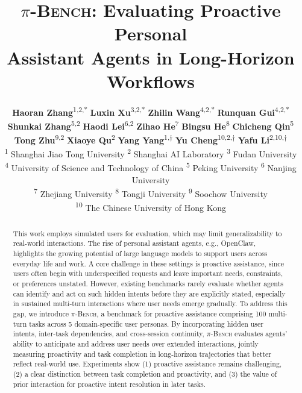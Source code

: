 \documentclass{article}
\title{\textsc{$\pi$-Bench}: Evaluating Proactive Personal \\ Assistant Agents in Long-Horizon Workflows}
\author{
\begin{minipage}{\textwidth}
\centering
\normalfont
\textbf{Haoran Zhang}\textsuperscript{1,2,*}\hspace{1em}
\textbf{Luxin Xu}\textsuperscript{3,2,*}\hspace{1em}
\textbf{Zhilin Wang}\textsuperscript{4,2,*}\hspace{1em}
\textbf{Runquan Gui}\textsuperscript{4,2,*}\\
\textbf{Shunkai Zhang}\textsuperscript{5,2}\hspace{1em}
\textbf{Haodi Lei}\textsuperscript{6,2}\hspace{1em}
\textbf{Zihao He}\textsuperscript{7}\hspace{1em}
\textbf{Bingsu He}\textsuperscript{8}\hspace{1em}
\textbf{Chicheng Qin}\textsuperscript{5}\\
\textbf{Tong Zhu}\textsuperscript{9,2}\hspace{1em}
\textbf{Xiaoye Qu}\textsuperscript{2}\hspace{1em}
\textbf{Yang Yang}\textsuperscript{1,$\dagger$}\hspace{1em}
\textbf{Yu Cheng}\textsuperscript{10,2,$\dagger$}\hspace{1em}
\textbf{Yafu Li}\textsuperscript{2,10,$\dagger$}
\\[0.6em]
{\small
\textsuperscript{1} Shanghai Jiao Tong University \quad
\textsuperscript{2} Shanghai AI Laboratory \quad
\textsuperscript{3} Fudan University \\
\textsuperscript{4} University of Science and Technology of China \quad
\textsuperscript{5} Peking University \quad
\textsuperscript{6} Nanjing University \\
\textsuperscript{7} Zhejiang University \quad
\textsuperscript{8} Tongji University  \quad
\textsuperscript{9} Soochow University \\
\textsuperscript{10} The Chinese University of Hong Kong
}
\end{minipage}
}
\newcommand{\bench}{\textsc{$\pi$-Bench}}
\begin{document}
\maketitle

\renewcommand{\thefootnote}{\fnsymbol{footnote}}


\begin{abstract}
This work employs simulated users for evaluation, which may limit generalizability to real-world interactions.
The rise of personal assistant agents, e.g., OpenClaw, highlights the growing potential of large language models to support users across everyday life and work. A core challenge in these settings is proactive assistance, since users often begin with underspecified requests and leave important needs, constraints, or preferences unstated. 
However, existing benchmarks rarely evaluate whether agents can identify and act on such hidden intents before they are explicitly stated, especially in sustained multi-turn interactions where user needs emerge gradually.
To address this gap, we introduce {\bench}, a benchmark for proactive assistance comprising 100 multi-turn tasks across 5 domain-specific user personas. By incorporating hidden user intents, inter-task dependencies, and cross-session continuity, {\bench} evaluates agents’ ability to anticipate and address user needs over extended interactions, jointly measuring proactivity and task completion in long-horizon trajectories that better reflect real-world use.
Experiments show (1) proactive assistance remains challenging, (2) a clear distinction between task completion and proactivity, and (3) the value of prior interaction for proactive intent resolution in later tasks.
\end{abstract}
\end{document}
